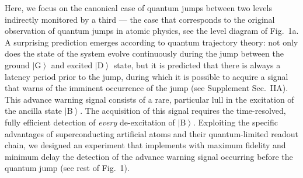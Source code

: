 \documentclass[
	 			preprint,     		superscriptaddress, 																longbibliography,
		amsmath, amssymb,
		aps,  prb,   		floatfix,
		linenumbers     
	]{revtex4-1}
\newcommand{\ket}[1]{\left|#1\right>}
\begin{document}
Here, we focus on the canonical  case of quantum jumps between two levels indirectly monitored by a third --- the case that corresponds to the original observation of quantum jumps in atomic physics\cite{Nagourney1986, Sauter1986, Bergquist1986}, see the level diagram of Fig.~1a.  
A surprising prediction emerges according to quantum trajectory theory:\cite{Carmichael1993, Porrati1987, Ruskov2007} not only does the state of the system evolve continuously during the jump between the ground $\ket{\mathrm{G}}$ and excited $\ket{\mathrm{D}}$ state, but  it is predicted that there is always a latency period prior to the jump, during which it is possible to acquire a signal that warns of the imminent occurrence of the jump (see Supplement Sec.~IIA).
This advance warning signal consists of a rare, particular lull in the excitation of the ancilla state $\ket{\mathrm{B}}$.
The acquisition of this signal requires the time-resolved, fully efficient detection of  \textit{every} de-excitation of $\ket{\mathrm{B}}$.
Exploiting the specific advantages of superconducting artificial atoms and their  quantum-limited readout chain, we designed an experiment that implements with maximum fidelity and minimum delay the detection of the  advance warning signal occurring before the quantum jump  (see rest of Fig.~1).
\end{document}

